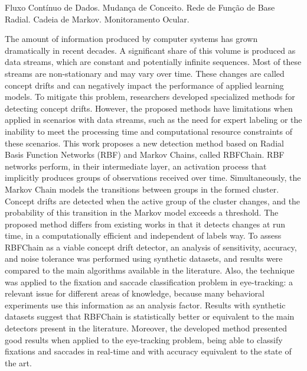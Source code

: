 \documentclass[msc, classic, a4paper]{ufbathesis}
\begin{document}
\begin{keywords}
    Fluxo Contínuo de Dados. Mudança de Conceito. Rede de Função de Base Radial. Cadeia de Markov. Monitoramento Ocular.
\end{keywords}

\abstract

The amount of information produced by computer systems has grown dramatically in recent decades.
A significant share of this volume is produced as data streams, which are constant and potentially infinite sequences.
Most of these streams are non-stationary and may vary over time.
These changes are called concept drifts and can negatively impact the performance of applied learning models.
To mitigate this problem, researchers developed specialized methods for detecting concept drifts.
However, the proposed methods have limitations when applied in scenarios with data streams,
such as the need for expert labeling or the inability to meet the processing time and computational resource constraints of these scenarios.
This work proposes a new detection method based on Radial Basis Function Networks (RBF) and Markov Chains, called RBFChain.
RBF networks perform, in their intermediate layer, an activation process that implicitly produces groups of observations received over time.
Simultaneously, the Markov Chain models the transitions between groups in the formed cluster.
Concept drifts are detected when the active group of the cluster changes, and the probability of this transition in the Markov model exceeds a threshold.
The proposed method differs from existing works in that it detects changes at run time,  in a computationally efficient and independent of labels way.
To assess RBFChain as a viable concept drift detector, an analysis of sensitivity, accuracy, and noise tolerance was performed using synthetic datasets, and results were compared to the main algorithms available in the literature.
Also, the technique was applied to the fixation and saccade classification problem in eye-tracking: a relevant issue for different areas of knowledge, because many behavioral experiments use this information as an analysis factor.
Results with synthetic datasets suggest that RBFChain is statistically better or equivalent to the main detectors present in the literature.
Moreover, the developed method presented good results when applied to the eye-tracking problem, being able to classify fixations and saccades in real-time and with accuracy equivalent to the state of the art.
\end{document}
